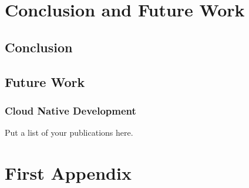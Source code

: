 \documentclass[
12pt,
oneside, 
onehalfspacing, 
nolistspacing, 
parskip, 
chapterinoneline, 
]{AASTCOMPUTER}
\begin{document}
\chapter{Conclusion and Future Work}
\section{Conclusion}
\section{Future Work}
\subsection{Cloud Native Development}
    
\listreferences

\begin{listofpublicationsp}
Put a list of your publications here.
\end{listofpublicationsp}


\appendixstart 
\chapter{First Appendix}

\end{document}
